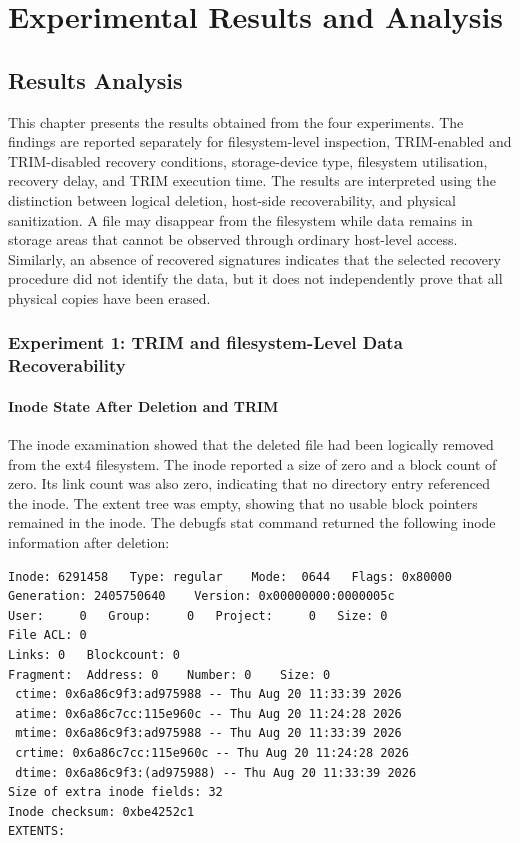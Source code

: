 \chapter{Experimental Results and Analysis}
\label{sec:experimental-results}

\section{Results Analysis}
This chapter presents the results obtained from the four experiments. The findings are reported separately for filesystem-level inspection, TRIM-enabled and TRIM-disabled recovery conditions, storage-device type, filesystem utilisation, recovery delay, and TRIM execution time.
The results are interpreted using the distinction between logical deletion, host-side recoverability, and physical sanitization. A file may disappear from the filesystem while data remains in storage areas that cannot be observed through ordinary host-level access. Similarly, an absence of recovered signatures indicates that the selected recovery procedure did not identify the data, but it does not independently prove that all physical copies have been erased.

\subsection{Experiment 1: TRIM and filesystem-Level Data Recoverability}

\subsubsection{Inode State After Deletion and TRIM}
The inode examination showed that the deleted file had been logically removed from the ext4 filesystem. The inode reported a size of zero and a block count of zero. Its link count was also zero, indicating that no directory entry referenced the inode. The extent tree was empty, showing that no usable block pointers remained in the inode.
The debugfs stat command returned the following inode information after deletion:

\begin{verbatim}
Inode: 6291458   Type: regular    Mode:  0644   Flags: 0x80000
Generation: 2405750640    Version: 0x00000000:0000005c
User:     0   Group:     0   Project:     0   Size: 0
File ACL: 0
Links: 0   Blockcount: 0
Fragment:  Address: 0    Number: 0    Size: 0
 ctime: 0x6a86c9f3:ad975988 -- Thu Aug 20 11:33:39 2026
 atime: 0x6a86c7cc:115e960c -- Thu Aug 20 11:24:28 2026
 mtime: 0x6a86c9f3:ad975988 -- Thu Aug 20 11:33:39 2026
 crtime: 0x6a86c7cc:115e960c -- Thu Aug 20 11:24:28 2026
 dtime: 0x6a86c9f3:(ad975988) -- Thu Aug 20 11:33:39 2026
Size of extra inode fields: 32
Inode checksum: 0xbe4252c1
EXTENTS:
\end{verbatim}


